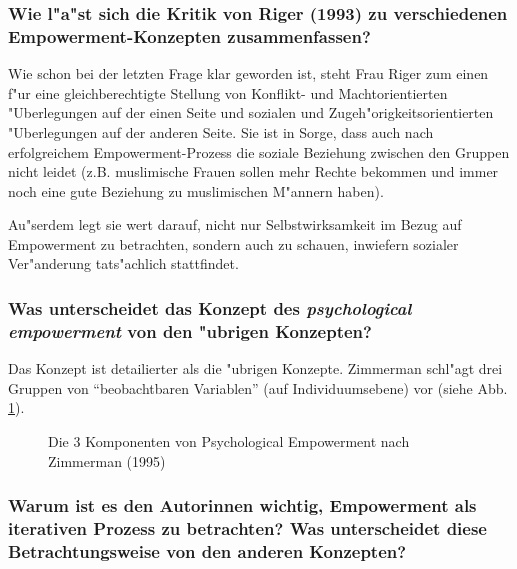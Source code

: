 \subsubsection{Wie l"a"st sich die Kritik von Riger (1993) zu verschiedenen Empowerment-Konzepten zusammenfassen?}
Wie schon bei der letzten Frage klar geworden ist, steht Frau Riger zum einen f"ur eine gleichberechtigte Stellung von Konflikt- und Machtorientierten "Uberlegungen auf der einen Seite und sozialen und Zugeh"origkeitsorientierten "Uberlegungen auf der anderen Seite. Sie ist in Sorge, dass auch nach erfolgreichem Empowerment-Prozess die soziale Beziehung zwischen den Gruppen nicht leidet (z.B. muslimische Frauen sollen mehr Rechte bekommen und immer noch eine gute Beziehung zu muslimischen M"annern haben).

Au"serdem legt sie wert darauf, nicht nur Selbstwirksamkeit im Bezug auf Empowerment zu betrachten, sondern auch zu schauen, inwiefern sozialer Ver"anderung tats"achlich stattfindet.

\subsubsection{Was unterscheidet das Konzept des \emph{psychological empowerment} von den "ubrigen Konzepten?}
Das Konzept ist detailierter als die "ubrigen Konzepte. Zimmerman schl"agt drei Gruppen von ``beobachtbaren Variablen'' (auf Individuumsebene) vor (siehe Abb. \ref{fig:cattaneo1}).

\begin{figure}[hb!]
        \begin{center}
        \end{center}
        \caption{Die 3 Komponenten von Psychological Empowerment nach Zimmerman (1995)}
        \label{fig:cattaneo1}
\end{figure}

\subsubsection{Warum ist es den Autorinnen wichtig, Empowerment als iterativen Prozess zu betrachten? Was unterscheidet diese Betrachtungsweise von den anderen Konzepten?}

